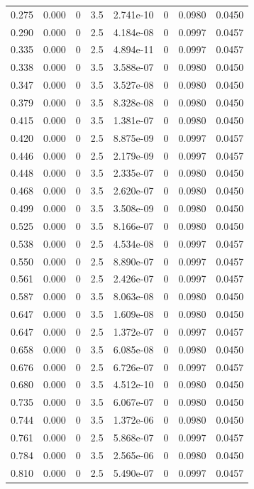 \documentclass[preview]{standalone}
\begin{document}
{{\begin{tabular}{L{1.2cm}C{1.2cm} C{0.3cm}C{0.5cm} C{1.4cm}C{1.4cm} C{1.4cm}C{1.4cm}}
  0.275  &  0.000  & 0     & 3.5 &  2.741e-10  & 0  & 0.0980 &  0.0450   \\ 
  0.290  &  0.000  & 0     & 2.5 &  4.184e-08  & 0  & 0.0997 &  0.0457   \\ 
  0.335  &  0.000  & 0     & 2.5 &  4.894e-11  & 0  & 0.0997 &  0.0457   \\ 
  0.338  &  0.000  & 0     & 3.5 &  3.588e-07  & 0  & 0.0980 &  0.0450   \\ 
  0.347  &  0.000  & 0     & 3.5 &  3.527e-08  & 0  & 0.0980 &  0.0450   \\ 
  0.379  &  0.000  & 0     & 3.5 &  8.328e-08  & 0  & 0.0980 &  0.0450   \\ 
  0.415  &  0.000  & 0     & 3.5 &  1.381e-07  & 0  & 0.0980 &  0.0450   \\ 
  0.420  &  0.000  & 0     & 2.5 &  8.875e-09  & 0  & 0.0997 &  0.0457   \\ 
  0.446  &  0.000  & 0     & 2.5 &  2.179e-09  & 0  & 0.0997 &  0.0457   \\ 
  0.448  &  0.000  & 0     & 3.5 &  2.335e-07  & 0  & 0.0980 &  0.0450   \\ 
  0.468  &  0.000  & 0     & 3.5 &  2.620e-07  & 0  & 0.0980 &  0.0450   \\ 
  0.499  &  0.000  & 0     & 3.5 &  3.508e-09  & 0  & 0.0980 &  0.0450   \\ 
  0.525  &  0.000  & 0     & 3.5 &  8.166e-07  & 0  & 0.0980 &  0.0450   \\ 
  0.538  &  0.000  & 0     & 2.5 &  4.534e-08  & 0  & 0.0997 &  0.0457   \\ 
  0.550  &  0.000  & 0     & 2.5 &  8.890e-07  & 0  & 0.0997 &  0.0457   \\ 
  0.561  &  0.000  & 0     & 2.5 &  2.426e-07  & 0  & 0.0997 &  0.0457   \\ 
  0.587  &  0.000  & 0     & 3.5 &  8.063e-08  & 0  & 0.0980 &  0.0450   \\ 
  0.647  &  0.000  & 0     & 3.5 &  1.609e-08  & 0  & 0.0980 &  0.0450   \\ 
  0.647  &  0.000  & 0     & 2.5 &  1.372e-07  & 0  & 0.0997 &  0.0457   \\ 
  0.658  &  0.000  & 0     & 3.5 &  6.085e-08  & 0  & 0.0980 &  0.0450   \\ 
  0.676  &  0.000  & 0     & 2.5 &  6.726e-07  & 0  & 0.0997 &  0.0457   \\ 
  0.680  &  0.000  & 0     & 3.5 &  4.512e-10  & 0  & 0.0980 &  0.0450   \\ 
  0.735  &  0.000  & 0     & 3.5 &  6.067e-07  & 0  & 0.0980 &  0.0450   \\ 
  0.744  &  0.000  & 0     & 3.5 &  1.372e-06  & 0  & 0.0980 &  0.0450   \\ 
  0.761  &  0.000  & 0     & 2.5 &  5.868e-07  & 0  & 0.0997 &  0.0457   \\ 
  0.784  &  0.000  & 0     & 3.5 &  2.565e-06  & 0  & 0.0980 &  0.0450   \\ 
  0.810  &  0.000  & 0     & 2.5 &  5.490e-07  & 0  & 0.0997 &  0.0457   \\ 
\hline 
\end{tabular} 

}}
\end{document}
